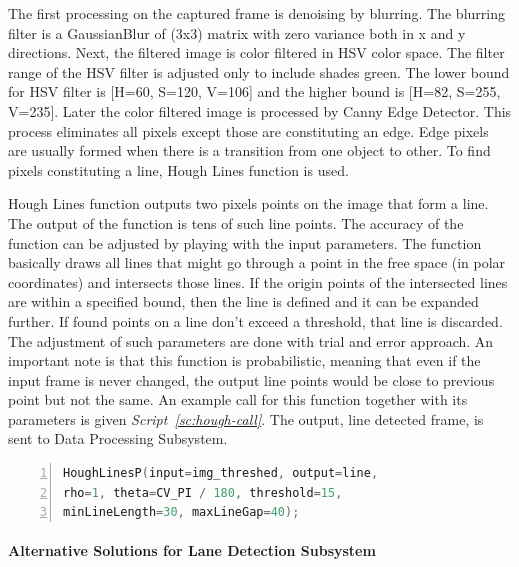 \documentclass[a4paper,12pt]{article}
\begin{document}
	The first processing on the captured frame is denoising by blurring. The blurring filter is a GaussianBlur of (3x3) matrix with zero variance both in x and y directions. Next, the filtered image is color filtered in HSV color space. The filter range of the HSV filter is adjusted only to include shades green. The lower bound for HSV filter is [H=60, S=120, V=106] and the higher bound is [H=82, S=255, V=235]. Later the color filtered image is processed by Canny Edge Detector. This process eliminates all pixels except those are constituting an edge. Edge pixels are usually formed when there is a transition from one object to other. To find pixels constituting a line, Hough Lines function is used.
	
	Hough Lines function outputs two pixels points on the image that form a line. The output of the function is tens of such line points. The accuracy of the function can be adjusted by playing with the input parameters. The function basically draws all lines that might go through a point in the free space (in polar coordinates) and intersects those lines. If the origin points of the intersected lines are within a specified bound, then the line is defined and it can be expanded further. If found points on a line don't exceed a threshold, that line is discarded. The adjustment of such parameters are done with trial and error approach. An important note is that this function is probabilistic, meaning that even if the input frame is never changed, the output line points would be close to previous point but not the same. An example call for this function together with its parameters is given \textit{Script~\ref{sc:hough-call}}. The output, line detected frame, is sent to Data Processing Subsystem.
		\begin{lstlisting}[language=C++,float=h,numbers=left,frame=single,caption=Hough Lines Function with its Parameters, captionpos=b, label=sc:hough-call]
HoughLinesP(input=img_threshed, output=line,
rho=1, theta=CV_PI / 180, threshold=15, 
minLineLength=30, maxLineGap=40);
	\end{lstlisting}
	
	\paragraph{Alternative Solutions for Lane Detection Subsystem}
	
\end{document}
